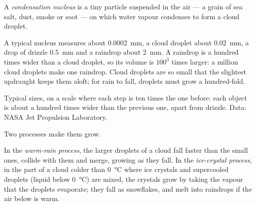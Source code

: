\begin{definition}\label{def:g10:why-clouds-form:nucleus}
A \emph{condensation nucleus} is a tiny particle
suspended in the air --- a grain of sea salt, dust, smoke or soot --- on
which water vapour condenses to form a cloud droplet.
\end{definition}

A typical nucleus measures about \qty{0.0002}{mm}, a cloud droplet about
\qty{0.02}{mm}, a drop of drizzle \qty{0.5}{mm} and a raindrop about
\qty{2}{mm}. A raindrop is a hundred times wider than a cloud droplet, so its
volume is $100^3$ times larger: a million cloud droplets make one raindrop. Cloud droplets are so small that the slightest updraught keeps
them aloft; for rain to fall, droplets must grow a hundred-fold.

\begin{omfigure}

{\small Typical sizes, on a scale where each step is ten times the one
before: each object is about a hundred times wider than the previous one,
apart from drizzle. Data: NASA Jet Propulsion Laboratory.}
\end{omfigure}

Two processes make them grow.

\begin{definition}\label{def:g10:why-clouds-form:rain-processes}
In the \emph{warm-rain process}, the larger
droplets of a cloud fall faster than the small ones, collide with them and
merge, growing as they fall. In the \emph{ice-crystal
process}, in the part of a cloud colder than
\qty{0}{\degreeCelsius} where ice crystals and supercooled droplets (liquid
below \qty{0}{\degreeCelsius}) are mixed, the crystals grow by taking the
vapour that the droplets evaporate; they fall as snowflakes, and melt into
raindrops if the air below is warm.
\end{definition}

